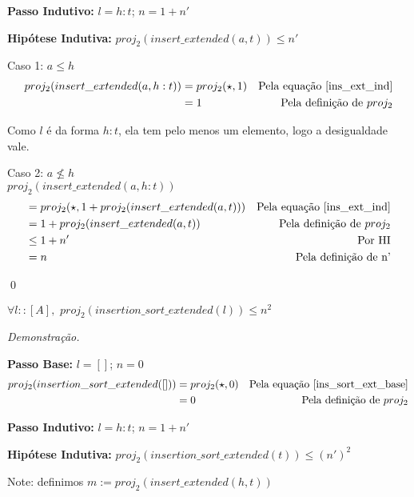 \documentclass[12pt, oneside, a4paper,english,brazil]{abntex2}
\begin{document}
\textbf{Passo Indutivo: } $l = h : t$; $n = 1 + n'$

\textbf{Hip\'otese Indutiva: } $proj_{2}(insert\_extended(a, t)) \le n'$

Caso 1: $a \le h$
\begin{align*}
  proj_{2}(insert\_extended(a, h : t)) &= proj_{2}(\star, 1) &\text{Pela equa\c{c}\~ao \ref{ins_ext_ind}} \\
  &= 1 &\text{Pela defini\c{c}\~ao de } proj_2
\end{align*}

Como $l$ \'e da forma $h : t$, ela tem pelo menos um elemento, logo a desigualdade vale.

Caso 2: $a \not\le h$ \\

$proj_{2}(insert\_extended(a, h : t))$
\begin{align*}
   &= proj_{2}(\star, 1 + proj_{2}(insert\_extended(a, t))) &\text{Pela equa\c{c}\~ao \ref{ins_ext_ind}} \\
   &= 1 + proj_{2}(insert\_extended(a, t)) &\text{Pela defini\c{c}\~ao de } proj_2 \\
   &\le 1 + n' &\text{Por HI} \\
   &= n &\text{Pela defini\c{c}\~ao de n'}
\end{align*}

\qed

\begin{teorema}
  $\forall l :: [A], \,\, proj_{2}(insertion\_sort\_extended(l)) \le n^{2}$
\end{teorema}

\noindent \textit{Demonstra\c{c}\~ao.}

\textbf{Passo Base: } $l = []$; $n = 0$
\begin{align*}
  proj_{2}(insertion\_sort\_extended([])) &= proj_{2}(\star, 0) &\text{Pela equa\c{c}\~ao \ref{ins_sort_ext_base}} \\
  &= 0 &\text{Pela defini\c{c}\~ao de } proj_2
\end{align*}

\textbf{Passo Indutivo: } $l = h : t$; $n = 1 + n'$

\textbf{Hip\'otese Indutiva: } $proj_{2}(insertion\_sort\_extended(t)) \le (n')^{2}$

Note: definimos $m := proj_{2}(insert\_extended(h, t))$ \\
\end{document}
